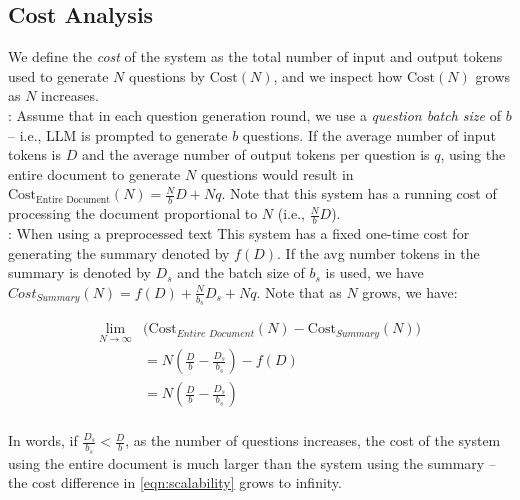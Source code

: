 \subsection{Cost Analysis}
\label{appendix:scalability}

We define the \emph{cost} of the system as the total number of input and output tokens used to generate $N$ questions by $\text{Cost}(N)$, and we inspect how $\text{Cost}(N)$ grows as $N$ increases. \\


: Assume that in each question generation round, we use a \emph{question batch size} of $b$ -- i.e., LLM is prompted to generate $b$ questions. If the average number of input tokens is $D$ and the average number of output tokens per question is $q$, using the entire document to generate $N$ questions would result in {\small $\text{Cost}_{\text{Entire Document}}(N) = \frac{N}{b} D + N q$}. 
Note that this system has a running cost of processing the document proportional to $N$ (i.e., $\frac{N}{b} D$). \\


: When using a preprocessed text This system has a fixed one-time cost for generating the summary denoted by $f(D)$. If the avg number tokens in the summary is denoted by $D_{s}$ and the batch size of $b_s$ is used, we have {\small $Cost_{\textit{Summary}}(N) = f(D) + \frac{N}{b_s} D_{s} + N q$}. Note that as $N$ grows, we have: 

\begin{small}
\begin{align}
    \lim_{N \rightarrow \infty} & \big( \text{Cost}_{\textit{Entire Document}}(N) 
    - \text{Cost}_{\textit{Summary}}(N) \big) \nonumber \\
    &= N \left(\frac{D}{b} - \frac{D_{s}}{b_s}\right)- f(D) \nonumber \\
    &= N \left(\frac{D}{b} - \frac{D_{s}}{b_s}\right) \nonumber \\
\label{eqn:scalability}
\end{align}
\end{small}

In words, if $\frac{D_{s}}{b_s} < \frac{D}{b}$, as the number of questions increases, the cost of the system using the entire document is much larger than the system using the summary -- the cost difference in \autoref{eqn:scalability} grows to infinity.
 
